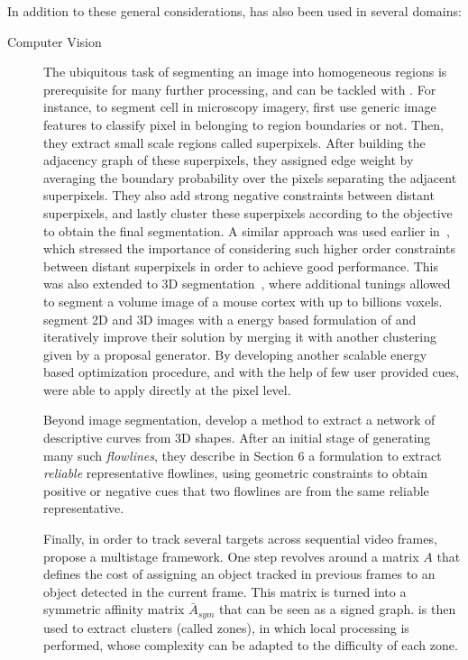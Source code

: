 In addition to these general considerations, \pcc{} has also been used in several domains:
\begin{description}
   \item[Computer Vision]
      The ubiquitous task of segmenting an image into homogeneous regions is prerequisite for many
      further processing, and can be tackled with \pcc{}. For instance, to segment cell in
      microscopy imagery, \textcite{CellSeg14} first use generic image features to classify pixel in
      belonging to region boundaries or not. Then, they extract small scale regions called
      superpixels. After building the adjacency graph of these superpixels, they assigned edge
      weight by averaging the boundary probability over the pixels separating the adjacent
      superpixels. They also add strong negative constraints between distant superpixels, and lastly
      cluster these superpixels according to the \pcc{} objective to obtain the final segmentation.
      A similar approach was used earlier in~\textcite{Kim2011}, which stressed the importance of
      considering such higher order constraints between distant superpixels in order to achieve good
      performance. This was also extended to 3D segmentation~\autocite{VolumeSegmentation12}, where
      additional tunings allowed to segment a volume image of a mouse cortex with up to billions
      voxels. \Textcite{Beier2015} segment 2D and 3D images with a energy based formulation of
      \pcc{} and iteratively improve their solution by merging it with another clustering given by a
      proposal generator. By developing another scalable energy based optimization procedure, and
      with the help of few user provided cues, \textcite{Bagon2011} were able to apply \pcc{}
      directly at the pixel level.

      Beyond image segmentation, \textcite{Shape3D17} develop a method to extract a network of
      descriptive curves from 3D shapes.  After an initial stage of generating many such
      \emph{flowlines}, they describe in Section 6 a \pcc{} formulation to extract \emph{reliable}
      representative flowlines, using geometric constraints to obtain positive or negative cues that
      two flowlines are from the same reliable representative.

      Finally, in order to track several targets across sequential video frames,
      \textcite{multiTracking15} propose a multistage framework. One step revolves around a matrix
      $A$ that defines the cost of assigning an object tracked in previous frames to an object
      detected in the current frame. This matrix is turned into a symmetric affinity matrix
      $\bar{A}_{sym}$ that can be seen as a signed graph. \pcc{} is then used to extract clusters
      (called zones), in which local processing is performed, whose complexity can be adapted to the
      difficulty of each zone.


\end{description}
